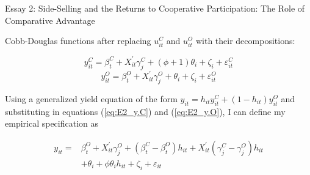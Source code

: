 \documentclass[aspectratio=169]{beamer}
\newenvironment{wideitemize}{\itemize\addtolength{\itemsep}{10pt}}{\enditemize}
\begin{document}
\begin{frame}{Essay 2: Side-Selling and the Returns to Cooperative Participation: The Role of Comparative Advantage}
    \begin{wideitemize}
        \item Cobb-Douglas functions after replacing $u^{C}_{it}$ and $u^{O}_{it}$ with their decompositions:

    \begin{equation} \label{eq:E2_y.C}
    y^{C}_{it} = \beta^{C}_{t} + X^{\prime}_{it}\gamma^{C}_{j} + (\phi + 1)\theta_{i} + \zeta_i + \varepsilon^{C}_{it}
    \end{equation}
    \begin{equation} \label{eq:E2_y.O}
    y^{O}_{it} = \beta^{O}_{t} + X^{\prime}_{it}\gamma^{O}_{j} + \theta_{i} + \zeta_i + \varepsilon^{O}_{it}
    \end{equation}
    
        \item Using a generalized yield equation of the form $y_{it} = h_{it}y^{C}_{it} + (1-h_{it})y^{O}_{it}$ and substituting in equations (\ref{eq:E2_y.C}) and (\ref{eq:E2_y.O}), I can define my empirical specification as

\begin{equation} \label{eq:E2_spec}
    \begin{split}
    y_{it} = & \beta^{O}_{t} + X^{\prime}_{it}\gamma^{O}_{j} + (\beta^{C}_{t} - \beta^{O}_{t})h_{it} +  X^{\prime}_{it}(\gamma^{C}_{j} - \gamma^{O}_{j})h_{it} \\
    & + \theta_{i} + \phi\theta_{i}h_{it} + \zeta_i + \varepsilon_{it}
    \end{split}
\end{equation}

\end{wideitemize}
\end{frame}
\end{document}
